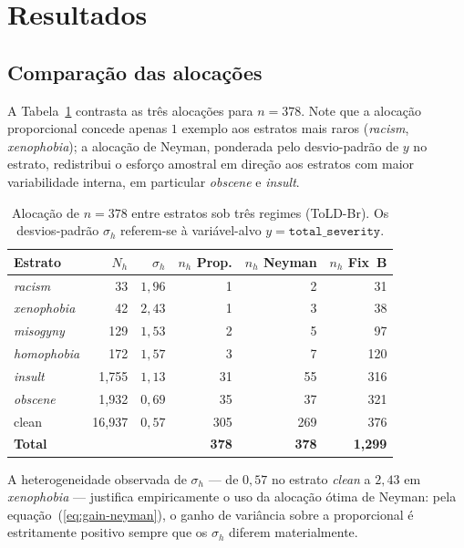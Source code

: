 \section{Resultados}
\label{sec:results}

\subsection{Comparação das alocações}

A Tabela~\ref{tab:allocations} contrasta as três alocações para $n=378$. Note
que a alocação proporcional concede apenas $1$ exemplo aos estratos mais
raros (\textit{racism}, \textit{xenophobia}); a alocação de Neyman, ponderada
pelo desvio-padrão de $y$ no estrato, redistribui o esforço amostral em
direção aos estratos com maior variabilidade interna, em particular
\textit{obscene} e \textit{insult}.

\begin{table}[!t]
\centering
\small
\caption{Alocação de $n=378$ entre estratos sob três regimes (ToLD-Br).
Os desvios-padrão $\sigma_h$ referem-se à variável-alvo
$y=\mathtt{total\_severity}$.}
\label{tab:allocations}
\begin{tabular}{lrrrrr}
\toprule
Estrato       & $N_h$ & $\sigma_h$ & $n_h$ Prop. & $n_h$ Neyman & $n_h$ Fix~B \\
\midrule
\textit{racism}     &     33 & $1{,}96$ &   1 &   2 &   31 \\
\textit{xenophobia} &     42 & $2{,}43$ &   1 &   3 &   38 \\
\textit{misogyny}   &    129 & $1{,}53$ &   2 &   5 &   97 \\
\textit{homophobia} &    172 & $1{,}57$ &   3 &   7 &  120 \\
\textit{insult}     & 1{,}755 & $1{,}13$ &  31 &  55 &  316 \\
\textit{obscene}    & 1{,}932 & $0{,}69$ &  35 &  37 &  321 \\
clean              & 16{,}937 & $0{,}57$ & 305 & 269 &  376 \\
\midrule
\textbf{Total}     &       &        & \textbf{378} & \textbf{378} & \textbf{1{,}299} \\
\bottomrule
\end{tabular}
\end{table}

A heterogeneidade observada de $\sigma_h$ --- de $0{,}57$ no estrato
\textit{clean} a $2{,}43$ em \textit{xenophobia} --- justifica empiricamente
o uso da alocação ótima de Neyman: pela equação~(\ref{eq:gain-neyman}), o
ganho de variância sobre a proporcional é estritamente positivo sempre que
os $\sigma_h$ diferem materialmente.


